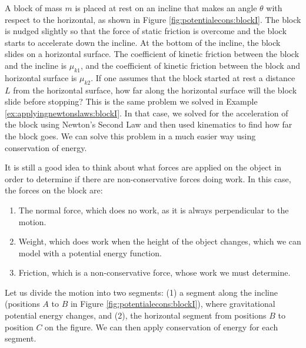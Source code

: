 \begin{example}{\label{ex:potentialecons:blockI}
A block of mass $m$ is placed at rest on an incline that makes an angle $\theta$ with respect to the horizontal, as shown in Figure \ref{fig:potentialecons:blockI}. The block is nudged slightly so that the force of static friction is overcome and the block starts to accelerate down the incline. At the bottom of the incline, the block slides on a horizontal surface. 
The coefficient of kinetic friction between the block and the incline is $\mu_{k1}$, and the coefficient of kinetic friction between the block and horizontal surface is $\mu_{k2}$. If one assumes that the block started at rest a distance $L$ from the horizontal surface, how far along the horizontal surface will the block slide before stopping?}
This is the same problem we solved in Example \ref{ex:applyingnewtonslaws:blockI}. In that case, we solved for the acceleration of the block using Newton's Second Law and then used kinematics to find how far the block goes. We can solve this problem in a much easier way using conservation of energy. 

It is still a good idea to think about what forces are applied on the object in order to determine if there are non-conservative forces doing work. In this case, the forces on the block are:
\begin{enumerate}
\item The normal force, which does no work, as it is always perpendicular to the motion.
\item Weight, which does work when the height of the object changes, which we can model with a potential energy function.
\item Friction, which is a non-conservative force, whose work we must determine. 
\end{enumerate}
Let us divide the motion into two segments: (1) a segment along the incline (positions $A$ to $B$ in Figure \ref{fig:potentialecons:blockI}), where gravitational potential energy changes, and (2), the horizontal segment from positions $B$ to position $C$ on the figure. We can then apply conservation of energy for each segment. 


\end{example}
